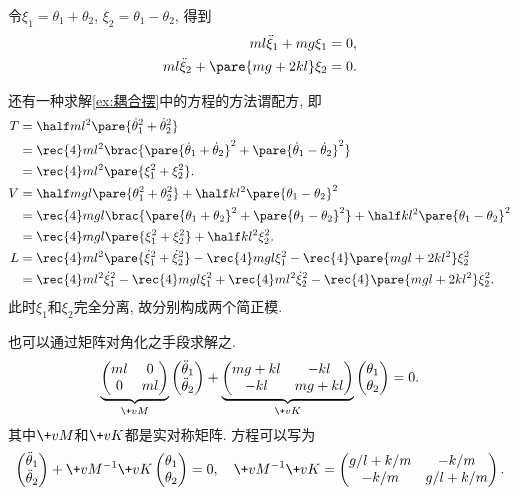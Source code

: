 \documentclass[../LectureNotes.tex]{subfiles}
\begin{document}
令$\xi_1 = \theta_1 + \theta_2$, $\xi_2 = \theta_1 - \theta_2$, 得到
\begin{align*}
    ml\ddot{\xi}_1 + mg\xi_1 &= 0, \\
    ml\ddot{\xi}_2 + \pare{mg+2kl} \xi_2 &= 0.
\end{align*}
\par
还有一种求解\cref{ex:耦合摆}中的方程的方法谓配方, 即
\begin{align*}
    T &= \half ml^2 \pare{\dot{\theta}_1^2 + \dot{\theta}_2^2} \\
    &= \rec{4} ml^2\brac{\pare{\dot{\theta}_1+\dot{\theta}_2}^2 + \pare{\dot{\theta}_1 - \dot{\theta}_2}^2} \\
    &= \rec{4} ml^2\pare{\xi_1^2 + \xi_2^2}. \\
    V &= \half mgl\pare{\theta_1^2 + \theta_2^2} + \half kl^2 \pare{\theta_1 - \theta_2}^2 \\
    &= \rec{4} mgl\brac{\pare{\theta_1 + \theta_2}^2 + \pare{\theta_1 - \theta_2}^2} + \half kl^2 \pare{\theta_1 - \theta_2}^2 \\
    &= \rec{4} mgl\pare{\xi_1^2 + \xi_2^2} + \half kl^2 \xi_2^2. \\
    L &= \rec{4}ml^2\pare{\dot{\xi}_1^2 + \dot{\xi}_2^2} - \rec{4}mgl\xi_1^2 - \rec{4}\pare{mgl+2kl^2}\xi_2^2 \\
    &= \rec{4}ml^2 \dot{\xi}_1^2 - \rec{4}mgl\xi_1^2 + \rec{4}ml^2\dot{\xi}_2^2 - \rec{4}\pare{mgl + 2kl^2}\xi_2^2.
\end{align*}
此时$\xi_1$和$\xi_2$完全分离, 故分别构成两个简正模.
\par
也可以通过矩阵对角化之手段求解之.
\[ \underbrace{\begin{pmatrix}
    ml & 0 \\ 0 & ml
\end{pmatrix}}_{\+vM}\begin{pmatrix}
    \ddot{\theta}_1 \\ \ddot{\theta}_2
\end{pmatrix} + \underbrace{\begin{pmatrix}
    mg+kl & -kl \\ -kl & mg+kl
\end{pmatrix}}_{\+vK}\begin{pmatrix}
    \theta_1 \\ \theta_2
\end{pmatrix} = 0. \]
其中$\+vM$和$\+vK$都是实对称矩阵. 方程可以写为
\[ \begin{pmatrix}
    \ddot{\theta}_1 \\ \ddot{\theta}_2
\end{pmatrix} + \+vM^{-1}\+vK \begin{pmatrix}
    \theta_1 \\ \theta_2
\end{pmatrix} = 0,\quad \+vM^{-1}\+vK = \begin{pmatrix}
    g/l + k/m & -k/m \\
    -k/m & g/l + k/m
\end{pmatrix}. \]
\end{document}

